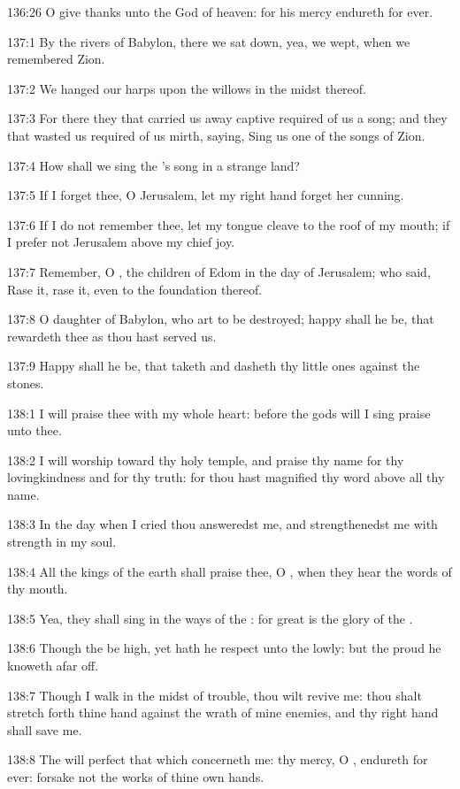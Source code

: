 136:26 O give thanks unto the God of heaven: for his mercy endureth for ever.



137:1 By the rivers of Babylon, there we sat down, yea, we wept, when we remembered Zion.

137:2 We hanged our harps upon the willows in the midst thereof.

137:3 For there they that carried us away captive required of us a song; and they that wasted us required of us mirth, saying, Sing us one of the songs of Zion.

137:4 How shall we sing the \LORD's song in a strange land?

137:5 If I forget thee, O Jerusalem, let my right hand forget her cunning.

137:6 If I do not remember thee, let my tongue cleave to the roof of my mouth; if I prefer not Jerusalem above my chief joy.

137:7 Remember, O \LORD, the children of Edom in the day of Jerusalem; who said, Rase it, rase it, even to the foundation thereof.

137:8 O daughter of Babylon, who art to be destroyed; happy shall he be, that rewardeth thee as thou hast served us.

137:9 Happy shall he be, that taketh and dasheth thy little ones against the stones.



138:1 I will praise thee with my whole heart: before the gods will I sing praise unto thee.

138:2 I will worship toward thy holy temple, and praise thy name for thy lovingkindness and for thy truth: for thou hast magnified thy word above all thy name.

138:3 In the day when I cried thou answeredst me, and strengthenedst me with strength in my soul.

138:4 All the kings of the earth shall praise thee, O \LORD, when they hear the words of thy mouth.

138:5 Yea, they shall sing in the ways of the \LORD: for great is the glory of the \LORD.

138:6 Though the \LORD be high, yet hath he respect unto the lowly: but the proud he knoweth afar off.

138:7 Though I walk in the midst of trouble, thou wilt revive me: thou shalt stretch forth thine hand against the wrath of mine enemies, and thy right hand shall save me.

138:8 The \LORD will perfect that which concerneth me: thy mercy, O \LORD, endureth for ever: forsake not the works of thine own hands.



